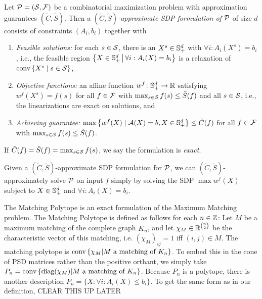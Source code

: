 \begin{definition}
Let $\mathcal P = (\mathcal S, \mathcal F)$ be a combinatorial maximization problem with approximation guarantees $(\tilde{C}, \tilde{S})$. Then a
  \emph{\((\tilde{C}, \tilde{S})\)-approximate SDP formulation of \(\mathcal P\)}
  of size \(d\)
  consists of constraints $(A_i, b_i)$
  together with
  \begin{enumerate}
  \item \emph{Feasible solutions:}
    for each $s \in \mathcal S$, there is an \(X^s \in \mathbb{S}^{d}_+\) with \(\forall i: A_i(X^s) = b_i\), i.e., the feasible region
    \(\left\{X \in \mathbb{S}^{d}_+\,\middle|\,\forall i: A_i(X) = b_i\right\}\)
    is a relaxation of \(\operatorname{conv}\left\{X^s \mid s \in \mathcal S\right\}\),
  \item \emph{Objective functions:}
    an affine function \(w^f \colon \mathbb{S}^{d}_+ \rightarrow \mathbb R\)
	satisfying
    \(w^f(X^s) = f(s)\) 
    for all \(f \in \mathcal F\) with \(\max_{s \in \mathcal S} f(s) \leq \tilde{S}(f)\) and 	all \(s \in \mathcal S\),
    i.e., the linearizations are exact on solutions, and
  \item \emph{Achieving guarantee:}
    \(\max \left\{ w^f(X) \mid \mathcal A(X) = b, X \in \mathbb{S}^{d}_+\right\} \leq \tilde{C}(f)\)
    for all \(f \in \mathcal F\) with \(\max_{s \in \mathcal S} f(s) \leq \tilde{S}(f)\).
  \end{enumerate}
	If $\tilde{C}(f) = \tilde{S}(f) = \max_{s\in \mathcal S} f(s)$, we say the formulation is \emph{exact}.
\end{definition}
Given a $(\tilde{C}, \tilde{S})$-approximate SDP formulation for $\mathcal P$, we can $(\tilde{C}, \tilde{S})$-approximately solve $\mathcal P$ on input $f$ simply by solving
the SDP $\max w^f(X)$ subject to $X \in \mathbb{S}^{d}_+$ and $\forall i: A_i(X) = b_i$.

\begin{example}
The Matching Polytope is an exact formulation of the Maximum Matching problem. The Matching Polytope is defined as follows for each $n \in \mathbb Z$: Let $M$ be a maximum matching of the complete graph $K_n$, and let $\chi_M \in \mathbb R^{\binom{n}{2}}$ be the characteristic vector of this matching, i.e. $(\chi_M)_{ij} = 1$ iff $(i,j) \in M$. The matching polytope is $\operatorname{conv}\left\{\chi_M | M \text{ a matching of $K_n$}\right\}$. To embed this in the cone of PSD matrices rather than the positive orthant, we simply take $P_n = \operatorname{conv}\left\{\text{diag}(\chi_M) | M \text{ a matching of $K_n$}\right\}$. Because $P_n$ is a polytope, there is another description $P_n = \{X: \forall i: A_i(X) \leq b_i\}$. To get the same form as in our definition, CLEAR THIS UP LATER

\end{example}

